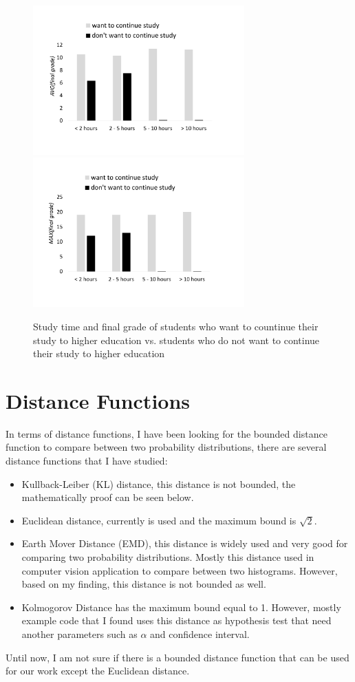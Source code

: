 \documentclass{article}
\begin{document}
\begin{figure}%
	\centering
	\includegraphics[width=3.2in]{figures/AVG_STUDENT}
	\includegraphics[width=3.2in]{figures/MAX_STUDENT}
	\caption{Study time and final grade of students who want to countinue their study to higher education vs. students who do not want to continue their study to higher education}%
	\label{fig:motivation_dataset}%
\end{figure}

\section{Distance Functions}


In terms of distance functions, I have been looking for the bounded distance function to compare between two probability distributions, there are several distance functions that I have studied: 

\begin{itemize}
	\item Kullback-Leiber (KL) distance, this distance is not bounded, the mathematically proof can be seen below.
	\item Euclidean distance, currently is used and the maximum bound is $ \sqrt{2} $.
	\item Earth Mover Distance (EMD), this distance is widely used and very good for comparing two probability distributions. Mostly this distance used in computer vision application to compare between two histograms. However, based on my finding, this distance is not bounded as well.
	\item Kolmogorov Distance has the maximum bound equal to 1. However, mostly example code that I found uses this distance as hypothesis test that need another parameters such as $\alpha$ and confidence interval. 
\end{itemize}
Until now, I am not sure if there is a bounded distance function that can be used for our work except the Euclidean distance. 
\end{document}
